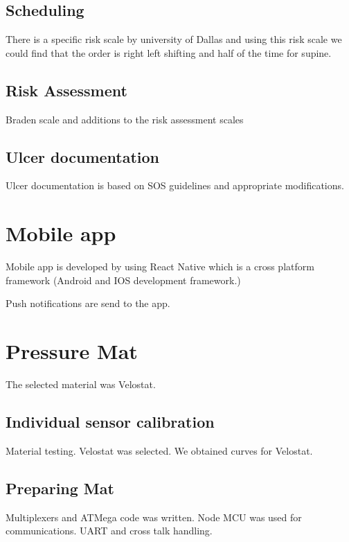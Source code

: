 \subsection{Scheduling}

There is a specific risk scale by university of Dallas and using this risk scale we could find that the order is right left shifting and half of the time for supine.

\subsection{Risk Assessment}

Braden scale and additions to the risk assessment scales

\subsection{Ulcer documentation}

Ulcer documentation is based on SOS guidelines and appropriate modifications.




\section{Mobile app} 

Mobile app is developed by using React Native which is a cross platform framework (Android and IOS development framework.)

Push notifications are send to the app.




\section{Pressure Mat}


The selected material was Velostat. 

\subsection{Individual sensor calibration}

 Material testing. Velostat was selected. We obtained curves for Velostat.


\subsection{Preparing Mat}

Multiplexers and ATMega code was written. Node MCU was used for communications. UART and cross talk handling.




